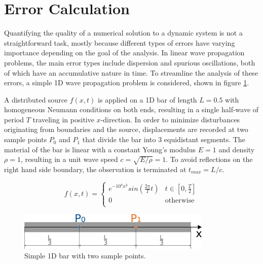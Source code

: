%
\section{Error Calculation}
\label{section:error_calculation}
%

Quantifying the quality of a numerical solution to a dynamic system is not a straightforward task, mostly because different types of errors have varying importance depending on the goal of the analysis. In linear wave propagation problems, the main error types include dispersion and spurious oscillations, both of which have an accumulative nature in time. To streamline the analysis of these errors, a simple 1D wave propagation problem is considered, shown in figure \ref{fig:toy_problem}.

A distributed source $f(x,t)$ is applied on a 1D bar of length $L=0.5$ with homogeneous Neumann conditions on both ends, resulting in a single half-wave of period $T$ traveling in positive $x$-direction. In order to minimize disturbances originating from boundaries and the source, displacements are recorded at two sample points $P_0$ and $P_1$ that divide the bar into 3 equidistant segments. The material of the bar is linear with a constant Young's modulus $E=1$ and density $\rho=1$, resulting in a unit wave speed $c=\sqrt{E / \rho}=1$. To avoid reflections on the right hand side boundary, the observation is terminated at $t_{max}=L/c$.

\begin{equation} \label{eq:toy_problem_source}
	f(x,t) = \begin{cases}
		e^{-10^4x^2} sin \left( \frac{2 \pi}{T} t \right) & t \in \left[ 0,\frac{T}{2} \right] \\
		0 & \text{otherwise} \\
	\end{cases}
\end{equation}

\begin{figure}[h]
	\centering
	\includegraphics[height=1.8cm]{pictures/figures/toy_problem.png}
	\caption{Simple 1D bar with two sample points.}
	\label{fig:toy_problem}
\end{figure}


